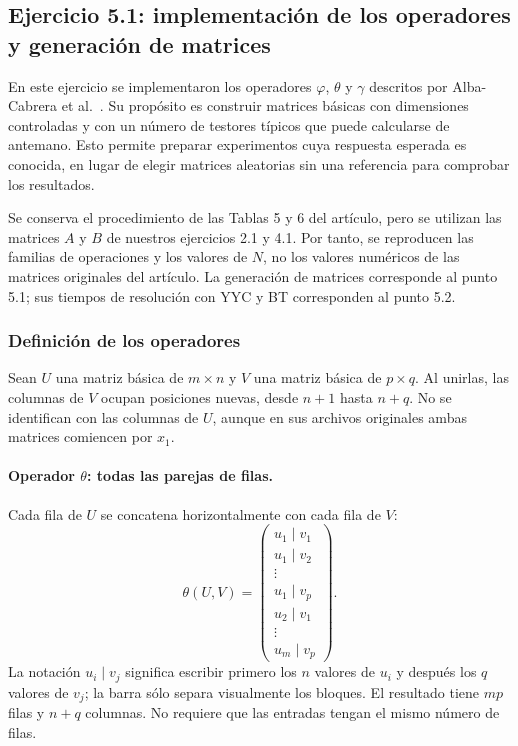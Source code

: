 \subsection{Ejercicio 5.1: implementación de los operadores y generación de matrices}
\label{sec:ejercicio51}

En este ejercicio se implementaron los operadores $\varphi$, $\theta$ y
$\gamma$ descritos por Alba-Cabrera et al.~\cite{alba2016}. Su propósito
es construir matrices básicas con dimensiones controladas y con un número
de testores típicos que puede calcularse de antemano. Esto permite preparar
experimentos cuya respuesta esperada es conocida, en lugar de elegir
matrices aleatorias sin una referencia para comprobar los resultados.

Se conserva el procedimiento de las Tablas 5 y 6 del artículo, pero se
utilizan las matrices $A$ y $B$ de nuestros ejercicios 2.1 y 4.1.
Por tanto, se reproducen las familias de operaciones y los valores de $N$,
no los valores numéricos de las matrices originales del artículo.
La generación de matrices corresponde al punto 5.1; sus tiempos de
resolución con YYC y BT corresponden al punto 5.2.

\subsubsection*{Definición de los operadores}

Sean $U$ una matriz básica de $m\times n$ y $V$ una matriz básica de
$p\times q$. Al unirlas, las columnas de $V$ ocupan posiciones nuevas,
desde $n+1$ hasta $n+q$. No se identifican con las columnas de $U$,
aunque en sus archivos originales ambas matrices comiencen por $x_1$.

\paragraph{Operador $\theta$: todas las parejas de filas.}
Cada fila de $U$ se concatena horizontalmente con cada fila de $V$:
\[
\theta(U,V)=
\begin{pmatrix}
u_1\mid v_1\\
u_1\mid v_2\\
\vdots\\
u_1\mid v_p\\
u_2\mid v_1\\
\vdots\\
u_m\mid v_p
\end{pmatrix}.
\]
La notación $u_i\mid v_j$ significa escribir primero los $n$ valores
de $u_i$ y después los $q$ valores de $v_j$; la barra sólo separa
visualmente los bloques. El resultado tiene $mp$ filas y $n+q$
columnas. No requiere que las entradas tengan el mismo número de filas.

